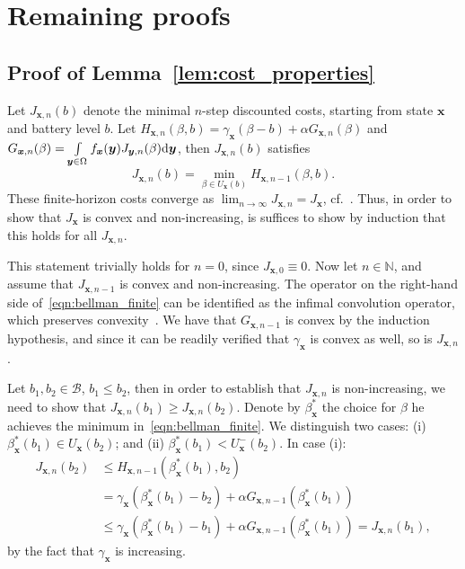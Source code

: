 \documentclass[journal]{IEEEtran}
\newcommand{\Bu}{\mathcal{B}}
\newcommand{\bfx}{\boldsymbol x}
\newcommand{\bfy}{\boldsymbol y}
\newcommand\1{\mathbf{1}}
\begin{document}
\appendix
\section{Remaining proofs}

\subsection{Proof of Lemma~\ref{lem:cost_properties}}\label{sec:proof_lemma}
\begin{IEEEproof}
Let $J_{\bfx,n}(b)$ denote the minimal $n$-step discounted costs, starting from state $\bfx$ and battery level $b$. Let $H_{\bfx,n}(\beta,b) =
\gamma_{\bfx}(\beta - b) + \alpha G_{\bfx,n}(\beta)$ and $G_{\bfx,n}(\beta) = \int\limits_{\bfy \in \Omega} f_{\bfx}(\bfy) J_{\bfy,n}(\beta){\rm d}\bfy$, then $J_{\bfx,n}(b)$ satisfies
\begin{equation}\label{eqn:bellman_finite}
J_{\bfx,n}(b) = \min_{\beta \in U_{\bfx}(b)} H_{\bfx,n-1}(\beta,b).
\end{equation}
These finite-horizon costs converge as $\lim_{n \rightarrow \infty} J_{\bfx,n} = J_{\bfx}$, cf.~\cite[Proposition 4.4]{BS96}. Thus, in order to show that $J_{\bfx}$ is convex and non-increasing, is suffices to show by induction that this holds for all $J_{\bfx,n}$.

This statement trivially holds for $n = 0$, since $J_{\bfx,0} \equiv 0$. Now let $n \in \mathds{N}$, and assume that $J_{\bfx,n-1}$ is convex and non-increasing. The operator on the right-hand side of~\eqref{eqn:bellman_finite} can be identified as the infimal convolution operator, which preserves convexity~\cite[Theorem 5.4]{Rockafellar72}. We have that $G_{\bfx,n-1}$ is convex by the induction hypothesis, and since it can be readily verified that $\gamma_{\bfx}$ is convex as well, so is $J_{\bfx,n}$.

Let $b_1, b_2 \in \Bu$, $b_1 \le b_2$, then in order to establish that $J_{\bfx,n}$ is non-increasing, we need to show that $J_{\bfx,n}(b_1) \ge J_{\bfx,n}(b_2)$. Denote by $\beta_{\bfx}^*$ the choice for $\beta$ he achieves the minimum in~\eqref{eqn:bellman_finite}. We distinguish two cases: (i) $\beta_{\bfx}^*(b_1) \in U_{\bfx}(b_2)$; and (ii) $\beta_{\bfx}^*(b_1) < U^-_{\bfx}(b_2)$. In case (i):
\begin{align*}
J_{\bfx,n}(b_2) &\le H_{\bfx,n-1}(\beta_{\bfx}^*(b_1),b_2)\\
&= \gamma_{\bfx}(\beta_{\bfx}^*(b_1) - b_2) + \alpha G_{\bfx,n-1}(\beta_{\bfx}^*(b_1))\\
&\le \gamma_{\bfx}(\beta_{\bfx}^*(b_1) - b_1) + \alpha G_{\bfx,n-1}(\beta_{\bfx}^*(b_1)) = J_{\bfx,n}(b_1),
\end{align*}
by the fact that $\gamma_{\bfx}$ is increasing.


\end{IEEEproof}
\end{document}
